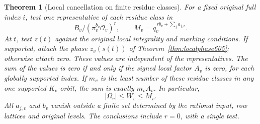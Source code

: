 \documentclass[a4paper,11pt]{article}
\newtheorem{theorem}[proposition]{Theorem}
\theoremstyle{definition}
\theoremstyle{remark}
\numberwithin{equation}{section}
\begin{document}
\begin{theorem}[Local cancellation on finite residue classes]
\leavevmode\label{thm:residueorbits606}
For a fixed original full index \(i\), test one representative
of each residue class in
\[
       B_v/(\pi_v^{b_v}\mathcal O_v)^r,\qquad
       M_v=q_v^{\,r b_v+\sum_j a_{j,v}} .
\]
At \(t\), test \(z(t)\) against the original local integrality
and marking conditions. If supported, attach the phase
\(z_v(s(t))\) of Theorem~\ref{thm:localphase605}; otherwise
attach zero. These values are independent of the representatives.
The sum of the values is zero if and only if the signed local
factor \(A_v\) is zero, for each globally supported index.
If \(m_v\) is the least number of these residue classes in
any one supported \(K_v\)-orbit, the sum is exactly \(m_v A_v\).
In particular,
\[
                       |\Omega_v|\le W_v\le M_v .
\]
All \(a_{j,v}\) and \(b_v\) vanish outside a finite set determined
by the rational input, row lattices and original levels. The
conclusions include \(r=0\), with a single test.
\end{theorem}
\end{document}
